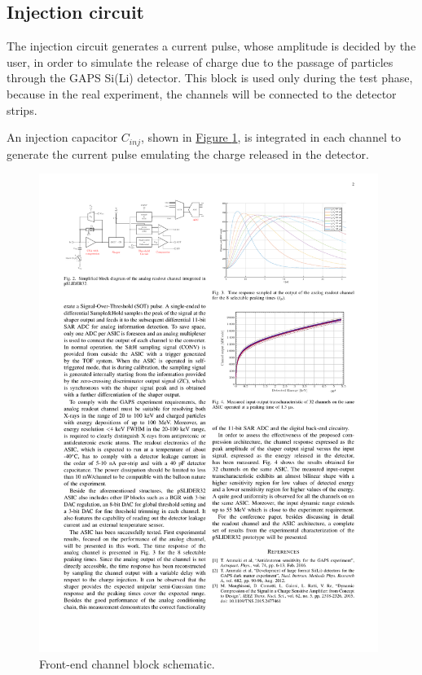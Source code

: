 
\subsection{Injection circuit}
The injection circuit generates a current pulse, whose amplitude is decided by the user, in order to simulate the release of charge due to the passage of particles through the GAPS Si(Li) detector. This block is used only during the test phase, because in the real experiment, the channels will be connected to the detector strips. 

\par
An injection capacitor $C_{inj}$, shown in \hyperref[figGAPSchannel]{Figure \ref{figGAPSchannel}}, is integrated in each channel to generate the current pulse emulating the charge released in the detector.

\begin{figure}[h!]
    \centering
    \includegraphics[width=0.98\textwidth]{Images/appendGAPSintro/readoutchannelADC.pdf}
    \caption{Front-end channel block schematic.}
    \label{figGAPSchannel}
\end{figure}

